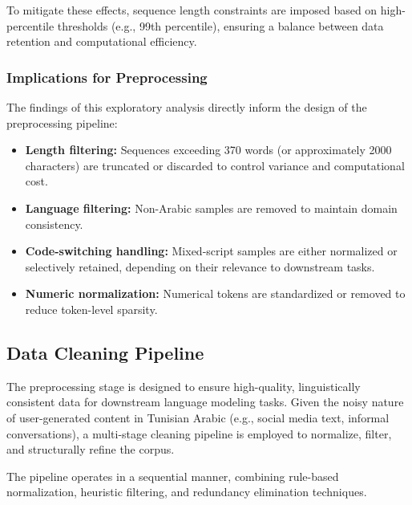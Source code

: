 \documentclass[12pt,a4paper]{report}
\begin{document}
To mitigate these effects, sequence length constraints are imposed based on high-percentile thresholds (e.g., 99th percentile), ensuring a balance between data retention and computational efficiency.


\subsubsection{Implications for Preprocessing}

The findings of this exploratory analysis directly inform the design of the preprocessing pipeline:

\begin{itemize}
    \item \textbf{Length filtering:} Sequences exceeding 370 words (or approximately 2000 characters) are truncated or discarded to control variance and computational cost.
    \item \textbf{Language filtering:} Non-Arabic samples are removed to maintain domain consistency.
    \item \textbf{Code-switching handling:} Mixed-script samples are either normalized or selectively retained, depending on their relevance to downstream tasks.
    \item \textbf{Numeric normalization:} Numerical tokens are standardized or removed to reduce token-level sparsity.
\end{itemize}

\subsection{Data Cleaning Pipeline}

The preprocessing stage is designed to ensure high-quality, linguistically consistent data for downstream language modeling tasks. Given the noisy nature of user-generated content in Tunisian Arabic (e.g., social media text, informal conversations), a multi-stage cleaning pipeline is employed to normalize, filter, and structurally refine the corpus.

The pipeline operates in a sequential manner, combining rule-based normalization, heuristic filtering, and redundancy elimination techniques.

\end{document}
